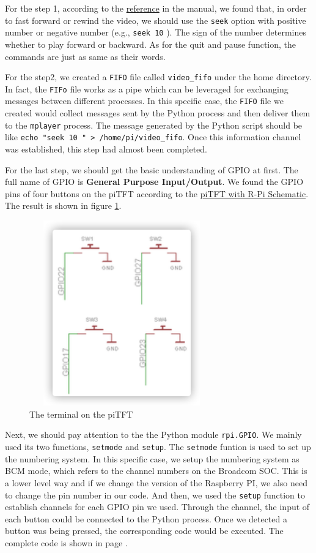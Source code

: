 \documentclass[12pt]{report}
\newcommand{\code}[1]{\colorbox{light-gray}{\texttt{#1}}}
\begin{document}
For the step 1, according to the \href{http://www.mplayerhq.hu/DOCS/tech/slave.txt}{reference} in the manual, we found that, in order to fast forward or rewind the video, we should use the \code{seek} option with positive number or negative number (e.g., \code{seek 10} ). The sign of the number determines whether to play forward or backward. As for the quit and pause function, the commands are just as same as their words.\par
For the step2, we created a \code{FIFO} file called \code{video\_fifo} under the home directory. In fact, the \code{FIFo} file works as a pipe which can be leveraged for exchanging messages between different processes. In this specific case, the \code{FIFO} file we created would collect messages sent by the Python process and then deliver them to the \code{mplayer} process. The message generated by the Python script should be like \code{echo "seek 10 " > /home/pi/video\_fifo}. Once this information channel was established, this step had almost been completed.\par
For the last step, we should get the basic understanding of GPIO at first. The full name of GPIO is \textbf{General Purpose Input/Output}. We found the GPIO pins of four buttons on the piTFT  according to the \href{https://canvas.cornell.edu/courses/32456/files/4093447?module_item_id=1105259}{piTFT with R-Pi Schematic}. The result is shown in figure \ref{fig:fig7}.
\begin{figure}[H]
    \includegraphics[width=8cm, height=8cm]{img/Figure7.png}
    \centering
    \caption{The terminal on the piTFT}
    \label{fig:fig7}
\end{figure}
Next, we should pay attention to the the Python module  \code{rpi.GPIO}. We mainly used its two functions, \code{setmode} and \code{setup}.
The \code{setmode} funtion is used to set up the numbering system. In this specific case, we setup the numbering system as BCM mode, which refers to the channel numbers on the Broadcom SOC. This is a lower level way and if we change the version of the Raspberry PI, we also need  to change the pin number in our code. And then, we used the \code{setup} function to establish channels for each GPIO pin we used. Through the channel, the input of each button could be connected to the Python process. Once we detected a button was being pressed, the corresponding code would be executed. The complete code is shown in page \pageref{code:5}.\par
\end{document}
